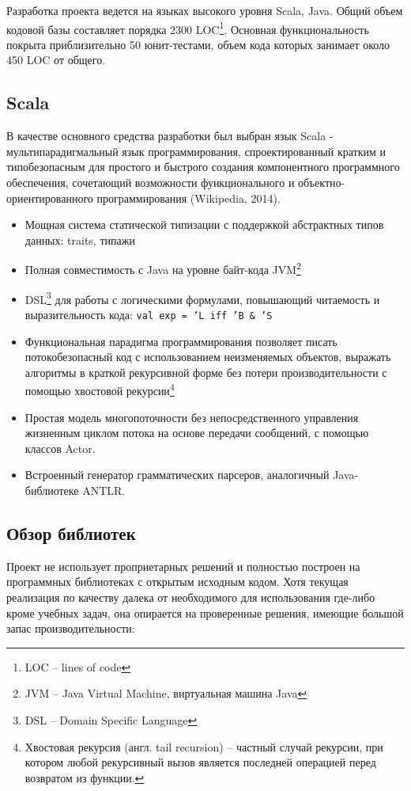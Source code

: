 Разработка проекта ведется на языках высокого уровня Scala, Java. Общий объем кодовой базы составляет порядка 2300 LOC\footnote{LOC -- lines of code}. Основная функциональность покрыта приблизительно 50 юнит-тестами, объем кода которых занимает около 450 LOC от общего.

\subsection{Scala}

В качестве основного средства разработки был выбран язык Scala -
мультипарадигмальный язык программирования, спроектированный кратким и
типобезопасным для простого и быстрого создания компонентного
программного обеспечения, сочетающий возможности функционального и
объектно-ориентированного программирования (Wikipedia, 2014).

\begin{itemize}
\item
  Мощная система статической типизации с поддержкой абстрактных типов
  данных: traits, типажи
\item
  Полная совместимость с Java на уровне байт-кода
  JVM\footnote{JVM -- Java Virtual Machine, виртуальная
  машина Java}
\item
  DSL\footnote{DSL -- Domain Specific Language} для работы с логическими формулами, повышающий читаемость и
  выразительность кода: \texttt{val exp = 'L iff 'B \& 'S}
\item
  Функциональная парадигма программирования позволяет писать
  потокобезопасный код с использованием неизменяемых объектов, выражать
  алгоритмы в краткой рекурсивной форме без потери
  производительности с помощью хвостовой рекурсии\footnote{Хвостовая рекурсия (англ. tail recursion) --  частный случай рекурсии, при котором любой рекурсивный вызов является последней операцией перед возвратом из функции.}
\item
  Простая модель многопоточности без непосредственного управления
  жизненным циклом потока на основе передачи сообщений, с помощью
  классов Actor.
\item
  Встроенный генератор грамматических парсеров, аналогичный Java-библиотеке ANTLR.
\end{itemize}

\subsection{Обзор библиотек}

Проект не использует проприетарных решений и полностью построен на программных библиотеках с открытым исходным кодом. Хотя текущая реализация по качеству далека от необходимого для использования где-либо кроме учебных задач, она опирается на проверенные решения, имеющие большой запас производительности:

